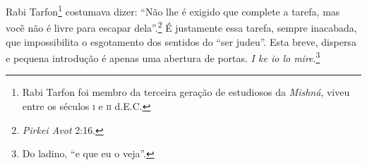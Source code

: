 Rabi Tarfon\footnote{Rabi Tarfon foi membro da terceira geração de estudiosos da \emph{Mishná}, viveu entre os séculos \textsc{i} e \textsc{ii} d.E.C.} costumava dizer: ``Não lhe é exigido que complete a tarefa, mas você não é livre para escapar dela''.\footnote{\emph{Pirkei Avot} 2:16.} É justamente essa tarefa, sempre inacabada, que impossibilita o esgotamento dos sentidos do ``ser judeu''. %
Esta breve, dispersa e pequena introdução é apenas uma abertura de
portas. \emph{I ke io lo mire}.\footnote{Do ladino, ``e que eu o veja''.}